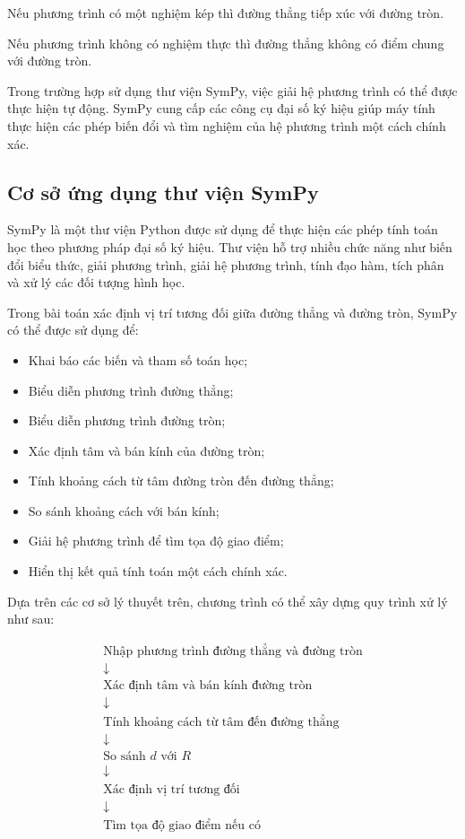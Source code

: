 \documentclass[12pt,a4paper]{article}
\begin{document}
Nếu phương trình có một nghiệm kép thì đường thẳng tiếp xúc với đường tròn.

Nếu phương trình không có nghiệm thực thì đường thẳng không có điểm chung với đường tròn.

Trong trường hợp sử dụng thư viện SymPy, việc giải hệ phương trình có thể được thực hiện tự động. SymPy cung cấp các công cụ đại số ký hiệu giúp máy tính thực hiện các phép biến đổi và tìm nghiệm của hệ phương trình một cách chính xác.


\subsection{Cơ sở ứng dụng thư viện SymPy}

SymPy là một thư viện Python được sử dụng để thực hiện các phép tính toán học theo phương pháp đại số ký hiệu. Thư viện hỗ trợ nhiều chức năng như biến đổi biểu thức, giải phương trình, giải hệ phương trình, tính đạo hàm, tích phân và xử lý các đối tượng hình học.

Trong bài toán xác định vị trí tương đối giữa đường thẳng và đường tròn, SymPy có thể được sử dụng để:

\begin{itemize}
    \item Khai báo các biến và tham số toán học;
    \item Biểu diễn phương trình đường thẳng;
    \item Biểu diễn phương trình đường tròn;
    \item Xác định tâm và bán kính của đường tròn;
    \item Tính khoảng cách từ tâm đường tròn đến đường thẳng;
    \item So sánh khoảng cách với bán kính;
    \item Giải hệ phương trình để tìm tọa độ giao điểm;
    \item Hiển thị kết quả tính toán một cách chính xác.
\end{itemize}

Dựa trên các cơ sở lý thuyết trên, chương trình có thể xây dựng quy trình xử lý như sau:

\[
\boxed{
\begin{array}{c}
\text{Nhập phương trình đường thẳng và đường tròn}\\
\downarrow\\
\text{Xác định tâm và bán kính đường tròn}\\
\downarrow\\
\text{Tính khoảng cách từ tâm đến đường thẳng}\\
\downarrow\\
\text{So sánh }d\text{ với }R\\
\downarrow\\
\text{Xác định vị trí tương đối}\\
\downarrow\\
\text{Tìm tọa độ giao điểm nếu có}
\end{array}
}
\]
\end{document}
